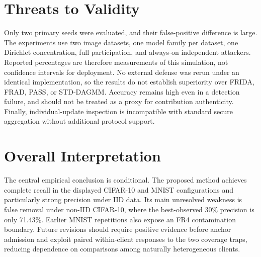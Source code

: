\section{Threats to Validity}

Only two primary seeds were evaluated, and their false-positive difference is large. The experiments use two image datasets, one model family per dataset, one Dirichlet concentration, full participation, and always-on independent attackers. Reported percentages are therefore measurements of this simulation, not confidence intervals for deployment. No external defense was rerun under an identical implementation, so the results do not establish superiority over FRIDA, FRAD, PASS, or STD-DAGMM. Accuracy remains high even in a detection failure, and should not be treated as a proxy for contribution authenticity. Finally, individual-update inspection is incompatible with standard secure aggregation without additional protocol support.

\section{Overall Interpretation}

The central empirical conclusion is conditional. The proposed method achieves complete recall in the displayed CIFAR-10 and MNIST configurations and particularly strong precision under IID data. Its main unresolved weakness is false removal under non-IID CIFAR-10, where the best-observed 30\% precision is only 71.43\%. Earlier MNIST repetitions also expose an FR4 contamination boundary. Future revisions should require positive evidence before anchor admission and exploit paired within-client responses to the two coverage traps, reducing dependence on comparisons among naturally heterogeneous clients.
